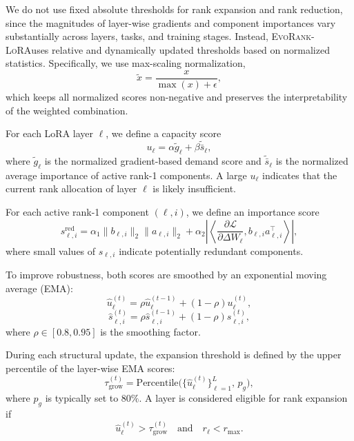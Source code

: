 \documentclass{article}
\newcommand{\method}{\textsc{EvoRank-LoRA}}
\begin{document}
We do not use fixed absolute thresholds for rank expansion and rank reduction, since the magnitudes of layer-wise gradients and component importances vary substantially across layers, tasks, and training stages. Instead, \method uses relative and dynamically updated thresholds based on normalized statistics. Specifically, we use max-scaling normalization,
\begin{equation}
    \tilde{x} = \frac{x}{\max(x)+\epsilon},
\end{equation}
which keeps all normalized scores non-negative and preserves the interpretability of the weighted combination.

For each LoRA layer $\ell$, we define a capacity score
\begin{equation}
    u_\ell = \alpha \tilde{g}_\ell + \beta \widetilde{\bar{s}}_\ell,
\end{equation}
where $\tilde{g}_\ell$ is the normalized gradient-based demand score and $\widetilde{\bar{s}}_\ell$ is the normalized average importance of active rank-1 components. A large $u_\ell$ indicates that the current rank allocation of layer $\ell$ is likely insufficient.

For each active rank-1 component $(\ell,i)$, we define an importance score
\begin{equation}
    s^{\mathrm{red}}_{\ell,i} = \alpha_1\|b_{\ell,i}\|_2\|a_{\ell,i}\|_2 + \alpha_2\left|\left\langle \frac{\partial \mathcal{L}}{\partial \Delta W_\ell}, b_{\ell,i}a_{\ell,i}^{\top}\right\rangle\right|,
\end{equation}
where small values of $s_{\ell,i}$ indicate potentially redundant components.

To improve robustness, both scores are smoothed by an exponential moving average (EMA):
\begin{equation}
    \hat{u}_\ell^{(t)}
    =
    \rho \hat{u}_\ell^{(t-1)} + (1-\rho) u_\ell^{(t)},
\end{equation}
\begin{equation}
    \hat{s}_{\ell,i}^{(t)}
    =
    \rho \hat{s}_{\ell,i}^{(t-1)} + (1-\rho) s_{\ell,i}^{(t)},
\end{equation}
where $\rho \in [0.8,0.95]$ is the smoothing factor.

During each structural update, the expansion threshold is defined by the upper percentile of the layer-wise EMA scores:
\begin{equation}
    \tau_{\mathrm{grow}}^{(t)}
    =
    \mathrm{Percentile}\bigl(\{\hat{u}_\ell^{(t)}\}_{\ell=1}^{L},\, p_g\bigr),
\end{equation}
where $p_g$ is typically set to $80\%$. A layer is considered eligible for rank expansion if
\begin{equation}
    \hat{u}_\ell^{(t)} > \tau_{\mathrm{grow}}^{(t)}
    \quad\text{and}\quad
    r_\ell < r_{\max}.
\end{equation}
\end{document}
